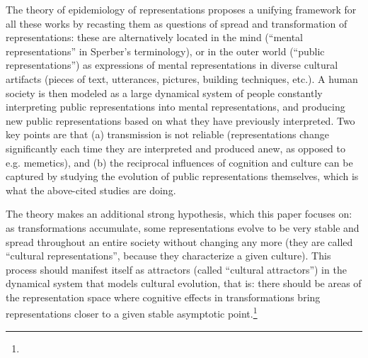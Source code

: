 \begin{new}
The theory of epidemiology of representations proposes a unifying framework for all these works by recasting them as questions of spread and transformation of representations:
these are alternatively located in the mind (``mental representations'' in Sperber's terminology), or in the outer world (``public representations'') as expressions of mental representations in diverse cultural artifacts (pieces of text, utterances, pictures, building techniques, etc.).
A human society is then modeled as a large dynamical system of people constantly interpreting public representations into mental representations, and producing new public representations based on what they have previously interpreted.
Two key points are that (a) transmission is not reliable (representations change significantly each time they are interpreted and produced anew, as opposed to \hbox{e.g.} memetics), and (b) the reciprocal influences of cognition and culture can be captured by studying the evolution of public representations themselves, which is what the above-cited studies are doing.

The theory makes an additional strong hypothesis, which this paper focuses on:
as transformations accumulate, some representations evolve to be very stable and spread throughout an entire society without changing any more (they are called ``cultural representations'', because they characterize a given culture).
This process should manifest itself as attractors (called ``cultural attractors'') in the dynamical system that models cultural evolution, that is:
there should be areas of the representation space where cognitive effects in transformations bring representations closer to a given stable asymptotic point.\footnote{
}


\end{new}
